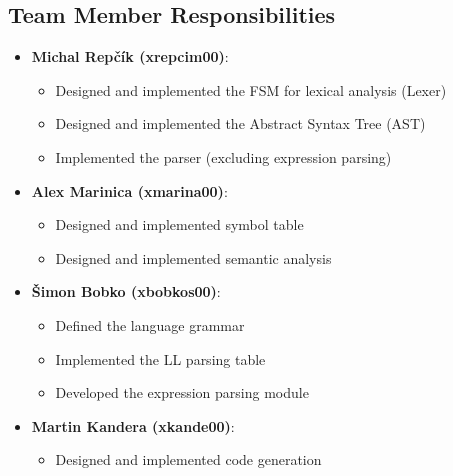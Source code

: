 \documentclass[12pt,a4paper]{article}
\begin{document}
\subsection{Team Member Responsibilities}
\begin{itemize}
    \item \textbf{Michal Repčík (xrepcim00)}: 
    \begin{itemize}
        \item Designed and implemented the FSM for lexical analysis (Lexer)
        \item Designed and implemented the Abstract Syntax Tree (AST)
        \item Implemented the parser (excluding expression parsing)
    \end{itemize}
    \item \textbf{Alex Marinica (xmarina00)}: 
    \begin{itemize}
        \item Designed and implemented symbol table
        \item Designed and implemented semantic analysis 
    \end{itemize}
    \item \textbf{Šimon Bobko (xbobkos00)}: 
    \begin{itemize}
        \item Defined the language grammar
        \item Implemented the LL parsing table
        \item Developed the expression parsing module
    \end{itemize}
    \item \textbf{Martin Kandera (xkande00)}: 
    \begin{itemize}
        \item Designed and implemented code generation
    \end{itemize}
\end{itemize}
\end{document}

